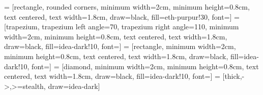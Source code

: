 \newenvironment{conditions}
  {\par\noindent\begin{tabular}{>{$}l<{$} @{${}={}$} l}}
  {\end{tabular}\par\vspace{0.5\belowdisplayskip}}

\lstset{style=code}

\usepackage[
  colorlinks=true,
  linkcolor=eth-grun,
  citecolor=eth-purpur,
  urlcolor=eth-petrol,
]{hyperref}
\usepackage{bookmark}

\renewcommand\d{\mathop{}\!\mathrm{d}}
\renewcommand\p{\mathop{}\!\mathrm{\partial}}

\usepackage{cleveref}

\setlength{\headheight}{14pt}


\usepackage{tikz}
\usetikzlibrary{shapes.geometric, arrows}
 = [rectangle, rounded corners, minimum width=2cm, minimum height=0.8cm, text centered, text width=1.8cm, draw=black, fill=eth-purpur!30, font=\tiny]
 = [trapezium, trapezium left angle=70, trapezium right angle=110, minimum width=2cm, minimum height=0.8cm, text centered, text width=1.8cm, draw=black, fill=idea-dark!10, font=\tiny]
 = [rectangle, minimum width=2cm, minimum height=0.8cm, text centered, text width=1.8cm, draw=black, fill=idea-dark!10, font=\tiny]
 = [diamond, minimum width=2cm, minimum height=0.8cm, text centered, text width=1.8cm, draw=black, fill=idea-dark!10, font=\tiny]
 = [thick,->,>=stealth, draw=idea-dark]


\usepackage{animate}

\usepackage{pdfpages}